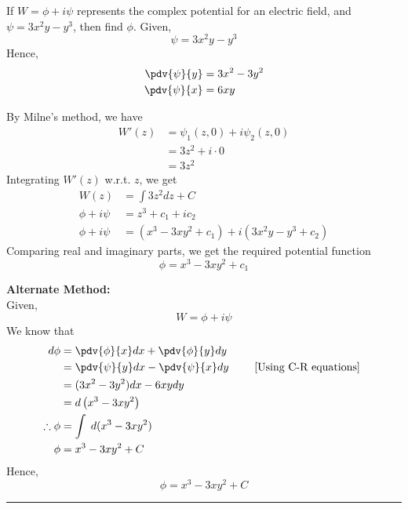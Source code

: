 \begin{example}{
        If $W = \phi + i\psi$ represents the complex potential for an electric field, and $\psi = 3x^2y-y^3$, then find $\phi$.
    }{}
    Given, \[
        \psi = 3x^2y - y^3
    \] Hence,
    \begin{align*}
        \pdv{\psi}{y} &= 3x^2 - 3y^2 \\
        \pdv{\psi}{x} &= 6xy
    \end{align*}
    
    By Milne's method, we have
    \begin{align*}
        W'(z) &= \psi_1(z,0) + i\psi_2(z,0) \\
        &= 3z^2 + i\cdot 0 \\
        &= 3z^2
    \end{align*}
    Integrating $W'(z)$ w.r.t. $z$, we get
    \begin{align*}
        W(z) &= \int 3z^2 dz + C \\
        \phi + i\psi &= z^3 + c_1 + ic_2 \\
        \phi + i\psi &= \left( x^3 - 3xy^2 + c_1 \right) + i\left( 3x^2y - y^3 + c_2 \right)
    \end{align*}
    Comparing real and imaginary parts, we get the required potential function \[
        \boxed{ \phi = x^3 - 3xy^2 + c_1 }
    \] 

    \textbf{Alternate Method:} \\
    Given, \[
        W = \phi + i\psi
    \] 
    We know that
    \begin{align*}
        d\phi &= \pdv{\phi}{x} dx + \pdv{\phi}{y} dy \\
              &= \pdv{\psi}{y} dx - \pdv{\psi}{x} dy \qquad\text{ [Using C-R equations] } \\
        &= (3x^2 - 3y^2) dx - 6xy dy \\
        &= d \left( x^3 - 3xy^2 \right) \\
        \therefore \phi &= \int {} \; d{(x^3 - 3xy^2)} \\
        \phi &= x^3 - 3xy^2 + C
    \end{align*}
    Hence, \[
        \boxed{ \phi = x^3 - 3xy^2 + C }
    \]
\end{example}

\vspace{20pt}\rule{3in}{1pt}
